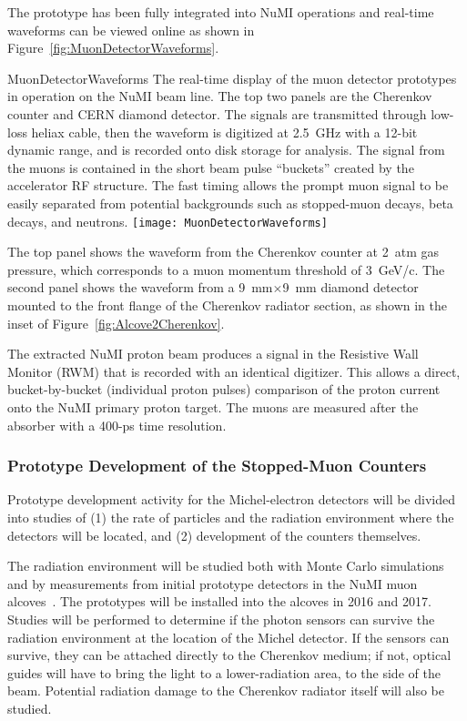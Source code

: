 The prototype has been %
fully integrated into NuMI operations and
real-time waveforms can be viewed online as shown in
Figure~\ref{fig:MuonDetectorWaveforms}.
\begin{cdrfigure}{MuonDetectorWaveforms}
{The real-time display of the muon detector prototypes in operation
on the NuMI beam line. The top two panels are the Cherenkov counter
and CERN diamond detector. The signals are
transmitted through low-loss heliax cable, then the waveform
is digitized at 2.5~GHz with a 12-bit dynamic range, and is
recorded onto disk storage for analysis. The signal from the
muons is contained in the short beam pulse ``buckets'' created
by the accelerator RF structure. The fast timing allows the
prompt muon signal to be easily separated from potential backgrounds
such as stopped-muon decays, beta decays, and neutrons.}
\texttt{[image: MuonDetectorWaveforms]}
\end{cdrfigure}
The top panel shows the waveform from the Cherenkov counter at 2~atm
gas pressure, which corresponds to a muon momentum threshold of
3~GeV/c. The second panel shows the waveform from a 9~mm$\times$9~mm
diamond detector mounted to the front flange of the Cherenkov radiator
section, as shown in the inset of Figure~\ref{fig:Alcove2Cherenkov}.

The extracted NuMI proton beam produces a signal in the Resistive Wall
Monitor (RWM) that is recorded with an identical digitizer. This allows a direct,
bucket-by-bucket (individual proton pulses) comparison of the proton
current onto the NuMI primary proton target. The muons are measured
after the absorber with a 400-ps time resolution.

\subsubsection{Prototype Development of the Stopped-Muon Counters}

Prototype development activity for the Michel-electron detectors will
be divided into studies of (1) the rate of particles and the radiation environment where
the detectors will be located, and (2) development of the counters
themselves.

The radiation environment will be studied both with Monte Carlo
simulations and by measurements from initial prototype detectors
in the NuMI muon alcoves~\cite{ref:NuMIBeamMonitors}.
The prototypes will be installed into the alcoves in 2016 and 2017.
Studies will be performed to determine if the photon sensors
can survive the radiation environment at the location of the Michel
detector. If the sensors can survive, they can be attached directly to
the Cherenkov medium; if not, optical guides will have to bring the
light to a lower-radiation area, to the side of the beam. Potential
radiation damage to the Cherenkov radiator itself will also be
studied.


